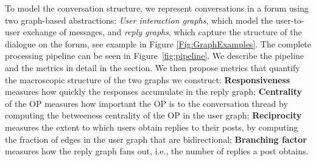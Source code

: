 
To model the conversation structure, we represent conversations in a forum using two graph-based abstractions: \textit{User interaction graphs}, which model the user-to-user exchange of messages, and  \textit{reply graphs}, which capture the structure of the dialogue on the forum, see example in Figure \ref{Fig:GraphExamples}. The complete processing pipeline can be seen in Figure~\ref{fig:pipeline}. We describe the pipeline and the metrics in detail in the  section.
We then propose metrics that quantify the macroscopic structure of the two graphs we construct:
\textbf{Responsiveness} measures how quickly the responses accumulate in the reply graph; \textbf{Centrality} of the OP  measures how important the OP is to the conversation thread by computing the betweeness centrality\cite{white1994betweenness} of the OP in the user graph; \textbf{Reciprocity} measures the extent to which users obtain replies to their posts, by computing the fraction of edges in the user graph that are bidirectional; \textbf{Branching factor} measures how the reply graph fans out, i.e., the number of replies a post obtains. 

